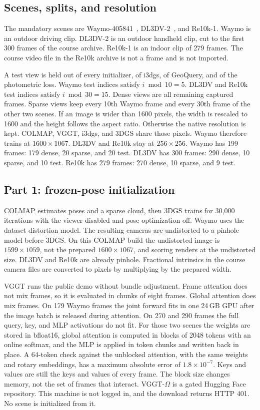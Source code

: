 \documentclass[10pt,twocolumn,letterpaper]{article}
\begin{document}
\subsection{Scenes, splits, and resolution}
The mandatory scenes are Waymo-405841~\cite{sun2020waymo}, DL3DV-2~\cite{ling2024dl3dv}, and Re10k-1.
Waymo is an outdoor driving clip.
DL3DV-2 is an outdoor handheld clip, cut to the first 300 frames of the course archive.
Re10k-1 is an indoor clip of 279 frames.
The course video file in the Re10k archive is not a frame and is not imported.

A test view is held out of every initializer, of i3dgs, of GeoQuery, and of the photometric loss.
Waymo test indices satisfy $i \bmod 10 = 5$.
DL3DV and Re10k test indices satisfy $i \bmod 30 = 15$.
Dense views are all remaining captured frames.
Sparse views keep every 10th Waymo frame and every 30th frame of the other two scenes.
If an image is wider than 1600 pixels, the width is rescaled to 1600 and the height follows the aspect ratio.
Otherwise the native resolution is kept.
COLMAP, VGGT, i3dgs, and 3DGS share those pixels.
Waymo therefore trains at $1600\times1067$.
DL3DV and Re10k stay at $256\times256$.
Waymo has 199 frames: 179 dense, 20 sparse, and 20 test.
DL3DV has 300 frames: 290 dense, 10 sparse, and 10 test.
Re10k has 279 frames: 270 dense, 10 sparse, and 9 test.

\subsection{Part 1: frozen-pose initialization}
COLMAP estimates poses and a sparse cloud, then 3DGS trains for 30{,}000 iterations with the viewer disabled and pose optimization off.
Waymo uses the dataset distortion model.
The resulting cameras are undistorted to a pinhole model before 3DGS.
On this COLMAP build the undistorted image is $1599\times1059$, not the prepared $1600\times1067$, and scoring renders at the undistorted size.
DL3DV and Re10k are already pinhole.
Fractional intrinsics in the course camera files are converted to pixels by multiplying by the prepared width.

VGGT runs the public demo without bundle adjustment.
Frame attention does not mix frames, so it is evaluated in chunks of eight frames.
Global attention does mix frames.
On 179 Waymo frames the joint forward fits in one 24\,GB GPU after the image batch is released during attention.
On 270 and 290 frames the full query, key, and MLP activations do not fit.
For those two scenes the weights are stored in bfloat16, global attention is computed in blocks of 2048 tokens with an online softmax, and the MLP is applied in token chunks and written back in place.
A 64-token check against the unblocked attention, with the same weights and rotary embeddings, has a maximum absolute error of $1.8\times10^{-7}$.
Keys and values are still the keys and values of every frame.
The block size changes memory, not the set of frames that interact.
VGGT-$\Omega$ is a gated Hugging Face repository.
This machine is not logged in, and the download returns HTTP 401.
No scene is initialized from it.
\end{document}
